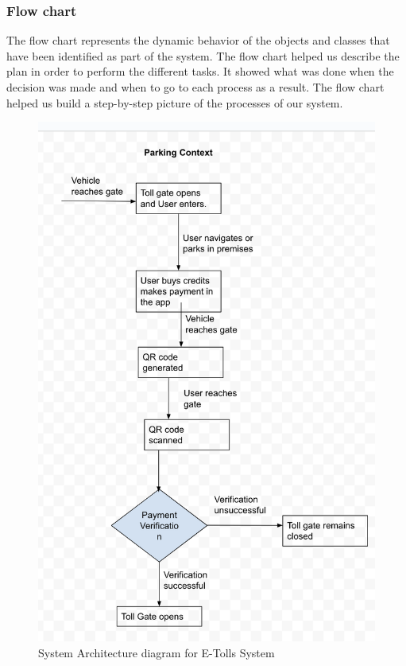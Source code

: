 \subsubsection{Flow chart}
The flow chart represents the dynamic behavior of the objects and classes that have been identified as part of the system. The flow chart helped us describe the plan in order to perform the different tasks. It showed what was done when the decision was made and when to go to each process as a result. The flow chart helped us build a step-by-step picture of the processes of our system.
\begin{figure}[h]
    \begin{center}
        \includegraphics[scale = 0.4]{images/userflowdiagram}
        \caption{System Architecture diagram for E-Tolls System}
    \end{center}
\end{figure}
\clearpage

